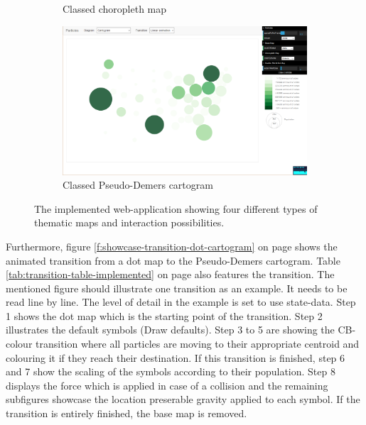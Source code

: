 \begin{figure}
\begin{subfigure}[b]{0.475\textwidth}
        \caption[Choropleth map]%
        {{\small Classed choropleth map}}
        \label{f:showcase-choropleth}
    \end{subfigure}
    \quad
    \begin{subfigure}[b]{0.475\textwidth}
        \centering
        \includegraphics[width=\textwidth]{images/results/map_cartogram.png}
        \caption[Pseudo-Demers cartogram]%
        {{\small Classed Pseudo-Demers cartogram}}
        \label{f:showcase-cartogram}
    \end{subfigure}
    \caption[The implemented web-application showing four different types of thematic maps and interaction possibilities.]
    {\small The implemented web-application showing four different types of thematic maps and interaction possibilities.}
    \label{f:showcase-overall}
\end{figure}

Furthermore, figure \ref{f:showcase-transition-dot-cartogram} on page \pageref{f:showcase-transition-dot-cartogram} shows the animated transition from a dot map to the Pseudo-Demers cartogram. Table \ref{tab:transition-table-implemented} on page \pageref{tab:transition-table-implemented} also features the transition. The mentioned figure should illustrate one transition as an example. It needs to be read line by line. The level of detail in the example is set to use state-data. Step 1 shows the dot map which is the starting point of the transition. Step 2 illustrates the default symbols (Draw defaults). Step 3 to 5 are showing the CB-colour transition where all particles are moving to their appropriate centroid and colouring it if they reach their destination. If this transition is finished, step 6 and 7 show the scaling of the symbols according to their population. Step 8 displays the force which is applied in case of a collision and the remaining subfigures showcase the location preserable gravity applied to each symbol. If the transition is entirely finished, the base map is removed.

